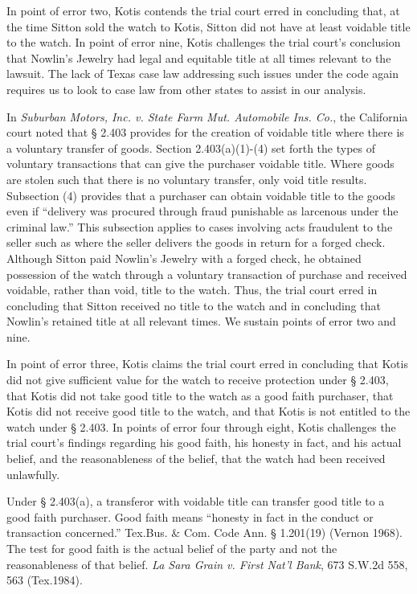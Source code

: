 In point of error two, Kotis contends the trial court erred in concluding that,
at the time Sitton sold the watch to Kotis, Sitton did not have at least
voidable title to the watch. In point of error nine, Kotis challenges the trial
court's conclusion that Nowlin's Jewelry had legal and equitable title at all
times relevant to the lawsuit. The lack of Texas case law addressing such
issues under the code again requires us to look to case law from other states
to assist in our analysis.

In \textit{Suburban Motors, Inc. v. State Farm Mut. Automobile Ins. Co.}, the
California court noted that {\S} 2.403 provides for the creation of voidable
title where there is a voluntary transfer of goods. Section 2.403(a)(1)-(4) set
forth the types of voluntary transactions that can give the purchaser voidable
title. Where goods are stolen such that there is no voluntary transfer, only
void title results. Subsection (4) provides that a purchaser can obtain
voidable title to the goods even if ``delivery was procured through fraud
punishable as larcenous under the criminal law.'' This subsection applies to
cases involving acts fraudulent to the seller such as where the seller delivers
the goods in return for a forged check. Although Sitton paid Nowlin's Jewelry
with a forged check, he obtained possession of the watch through a voluntary
transaction of purchase and received voidable, rather than void, title to the
watch. Thus, the trial court erred in concluding that Sitton received no title
to the watch and in concluding that Nowlin's retained title at all relevant
times. We sustain points of error two and nine.

In point of error three, Kotis claims the trial court erred in concluding that
Kotis did not give sufficient value for the watch to receive protection under
{\S} 2.403, that Kotis did not take good title to the watch as a good faith
purchaser, that Kotis did not receive good title to the watch, and that Kotis
is not entitled to the watch under {\S} 2.403. In points of error four through
eight, Kotis challenges the trial court's findings regarding his good faith,
his honesty in fact, and his actual belief, and the reasonableness of the
belief, that the watch had been received unlawfully.

Under {\S} 2.403(a), a transferor with voidable title can transfer good title to
a good faith purchaser. Good faith means ``honesty in fact in the conduct or
transaction concerned.'' Tex.Bus. \& Com. Code Ann. {\S} 1.201(19) (Vernon
1968). The test for good faith is the actual belief of the party and not the
reasonableness of that belief. \textit{La Sara Grain v. First Nat'l Bank}, 673
S.W.2d 558, 563 (Tex.1984).

